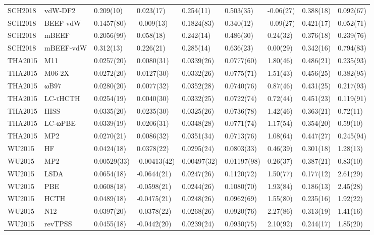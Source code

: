 \begin{table}[ht]
\begin{tabular}{lllllllll}
  SCH2018 & vdW-DF2 & 0.209(10) & 0.023(17) & 0.254(11) & 0.503(35) & -0.06(27) & 0.388(18) & 0.092(67) \\ 
  SCH2018 & BEEF-vdW & 0.1457(80) & -0.009(13) & 0.1824(83) & 0.340(12) & -0.09(27) & 0.421(17) & 0.052(71) \\ 
  SCH2018 & mBEEF & 0.2056(99) & 0.058(18) & 0.242(14) & 0.486(30) & 0.24(32) & 0.376(18) & 0.239(76) \\ 
  SCH2018 & mBEEF-vdW & 0.312(13) & 0.226(21) & 0.285(14) & 0.636(23) & 0.00(29) & 0.342(16) & 0.794(83) \\ 
  THA2015 & M11 & 0.0257(20) & 0.0080(31) & 0.0339(26) & 0.0777(60) & 1.80(46) & 0.486(21) & 0.235(93) \\ 
  THA2015 & M06-2X & 0.0272(20) & 0.0127(30) & 0.0332(26) & 0.0775(71) & 1.51(43) & 0.456(25) & 0.382(95) \\ 
  THA2015 & ωB97 & 0.0280(20) & 0.0077(32) & 0.0352(28) & 0.0740(76) & 0.87(46) & 0.431(25) & 0.217(93) \\ 
  THA2015 & LC-τHCTH & 0.0254(19) & 0.0040(30) & 0.0332(25) & 0.0722(74) & 0.72(44) & 0.451(23) & 0.119(91) \\ 
  THA2015 & HISS & 0.0335(20) & 0.0235(30) & 0.0325(26) & 0.0736(78) & 1.42(46) & 0.363(21) & 0.72(11) \\ 
  THA2015 & LC-ωPBE & 0.0339(19) & 0.0206(31) & 0.0348(28) & 0.0771(74) & 1.17(54) & 0.354(20) & 0.59(10) \\ 
  THA2015 & MP2 & 0.0270(21) & 0.0086(32) & 0.0351(34) & 0.0713(76) & 1.08(64) & 0.447(27) & 0.245(94) \\ 
  WU2015 & HF & 0.0424(18) & 0.0378(22) & 0.0295(24) & 0.0803(33) & 0.46(39) & 0.301(18) & 1.28(13) \\ 
  WU2015 & MP2 & 0.00529(33) & -0.00413(42) & 0.00497(32) & 0.01197(98) & 0.26(37) & 0.387(21) & 0.83(10) \\ 
  WU2015 & LSDA & 0.0654(18) & -0.0644(21) & 0.0247(26) & 0.1120(72) & 1.50(77) & 0.177(12) & 2.61(29) \\ 
  WU2015 & PBE & 0.0608(18) & -0.0598(21) & 0.0244(26) & 0.1080(70) & 1.93(84) & 0.186(13) & 2.45(28) \\ 
  WU2015 & HCTH & 0.0489(18) & -0.0475(21) & 0.0248(26) & 0.0962(69) & 1.55(80) & 0.235(16) & 1.92(22) \\ 
  WU2015 & N12 & 0.0397(20) & -0.0378(22) & 0.0268(26) & 0.0920(76) & 2.27(86) & 0.313(19) & 1.41(16) \\ 
  WU2015 & revTPSS & 0.0455(18) & -0.0442(20) & 0.0239(24) & 0.0930(75) & 2.10(92) & 0.244(17) & 1.85(20) \\ 

\end{tabular}
\end{table}
